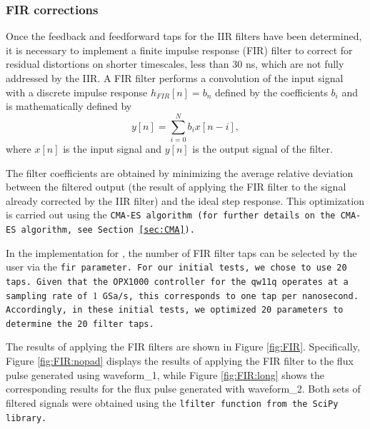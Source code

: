\subsubsection{FIR corrections}
Once the feedback and feedforward taps for the IIR filters have been determined, it is necessary to implement a finite impulse response (FIR) filter to correct for residual distortions on shorter timescales, less than 30 ns, which are not fully addressed by the IIR.
A FIR filter performs a convolution of the input signal with a discrete impulse response $h_{FIR}[n] = b_n$ defined by the coefficients $b_i$ and is mathematically defined by
\begin{equation}
        y[n] = \sum_{i=0}^{N} b_i x[n - i],
\end{equation}
where $x[n]$ is the input signal and $y[n]$ is the output signal of the filter.

The filter coefficients are obtained by minimizing the average relative deviation between the filtered output (the result of applying the FIR filter to the signal already corrected by the IIR filter) and the ideal step response. 
This optimization is carried out using the \tt{CMA-ES} algorithm (for further details on the \tt{CMA-ES} algorithm, see Section \ref{sec:CMA}).

In the implementation for \Qibocal, the number of FIR filter taps can be selected by the user via the \tt{fir} parameter. 
For our initial tests, we chose to use 20 taps. Given that the OPX1000 controller for the qw11q operates at a sampling rate of $1$ GSa/s, this corresponds to one tap per nanosecond. 
Accordingly, in these initial tests, we optimized 20 parameters to determine the 20 filter taps.

The results of applying the FIR filters are shown in Figure \ref{fig:FIR}. 
Specifically, Figure \ref{fig:FIR:nopad} displays the results of applying the FIR filter to the flux pulse generated using waveform\_1, while Figure \ref{fig:FIR:long} shows the corresponding results for the flux pulse generated with waveform\_2. 
Both sets of filtered signals were obtained using the \tt{lfilter} function from the \tt{SciPy} library.

